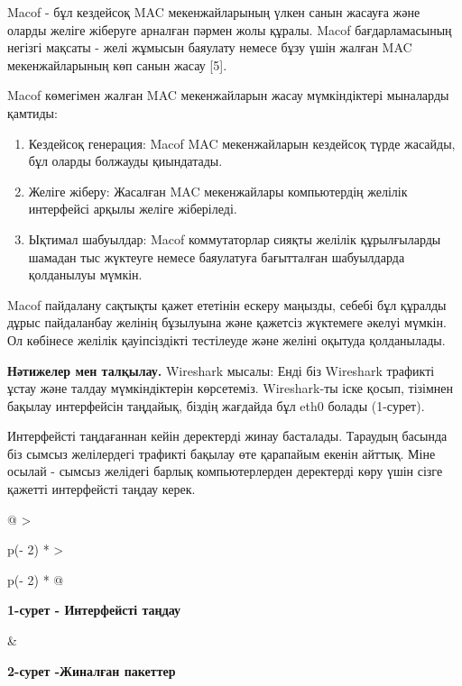 Macof - бұл кездейсоқ MAC мекенжайларының үлкен санын жасауға және
оларды желіге жіберуге арналған пәрмен жолы құралы. Macof
бағдарламасының негізгі мақсаты - желі жұмысын баяулату немесе бұзу үшін
жалған MAC мекенжайларының көп санын жасау {[}5{]}.

Macof көмегімен жалған MAC мекенжайларын жасау мүмкіндіктері мыналарды
қамтиды:

\begin{enumerate}
\def\labelenumi{\arabic{enumi}.}
\item
  Кездейсоқ генерация: Macof MAC мекенжайларын кездейсоқ түрде жасайды,
  бұл оларды болжауды қиындатады.
\item
  Желіге жіберу: Жасалған MAC мекенжайлары компьютердің желілік
  интерфейсі арқылы желіге жіберіледі.
\item
  Ықтимал шабуылдар: Macof коммутаторлар сияқты желілік құрылғыларды
  шамадан тыс жүктеуге немесе баяулатуға бағытталған шабуылдарда
  қолданылуы мүмкін.
\end{enumerate}

Macof пайдалану сақтықты қажет ететінін ескеру маңызды, себебі бұл
құралды дұрыс пайдаланбау желінің бұзылуына және қажетсіз жүктемеге
әкелуі мүмкін. Ол көбінесе желілік қауіпсіздікті тестілеуде және желіні
оқытуда қолданылады.

\textbf{Нәтижелер мен талқылау.} Wireshark мысалы: Енді біз Wireshark
трафикті ұстау және талдау мүмкіндіктерін көрсетеміз. Wireshark-ты іске
қосып, тізімнен бақылау интерфейсін таңдайық, біздің жағдайда бұл eth0
болады (1-сурет).

Интерфейсті таңдағаннан кейін деректерді жинау басталады. Тараудың
басында біз сымсыз желілердегі трафикті бақылау өте қарапайым екенін
айттық. Міне осылай - сымсыз желідегі барлық компьютерлерден деректерді
көру үшін сізге қажетті интерфейсті таңдау керек.

\begin{longtable}[]{@{}
  >{\raggedright\arraybackslash}p{(\columnwidth - 2\tabcolsep) * }
  >{\raggedright\arraybackslash}p{(\columnwidth - 2\tabcolsep) * }@{}}
\toprule\noalign{}
\begin{minipage}[b]{\linewidth}\raggedright

\textbf{1-сурет - Интерфейсті таңдау}
\end{minipage} & \begin{minipage}[b]{\linewidth}\raggedright

\textbf{2-сурет -Жиналған пакеттер}
\end{minipage} \\
\midrule\noalign{}
\endhead
\bottomrule\noalign{}
\endlastfoot
\end{longtable}


